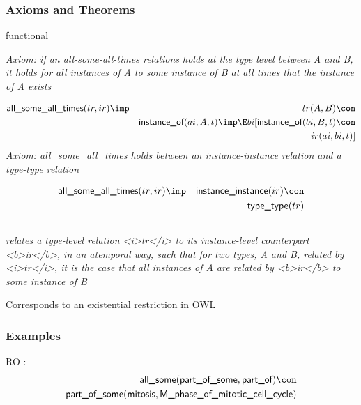 \subsubsection{Axioms and Theorems}

\begin{clist}
\item functional
\end{clist}

\emph{Axiom: if an all-some-all-times relations holds at the type level between A and B, it holds for all instances of A to some instance of B at all times that the instance of A exists}

\begin{eqnarray*}
 \pr{all\_some\_all\_times}(tr, ir) &\imp &tr(A, B) \con \\
&& \pr{instance\_of}(ai, A, t) \imp  \E bi[ \pr{instance\_of}(bi, B, t) \con \\
&&ir(ai, bi, t) ]
\end{eqnarray*}
\emph{Axiom: all\_some\_all\_times holds between an instance-instance relation and a type-type relation}

\begin{eqnarray*}
 \pr{all\_some\_all\_times}(tr, ir) &\imp & \pr{instance\_instance}(ir) \con \\
&& \pr{type\_type}(tr) 
\end{eqnarray*}

\subsection{ }
\emph{relates a type-level relation <i>tr</i> to its instance-level counterpart <b>ir</b>, in an atemporal way, such that for two types, A and B, related by <i>tr</i>, it is the case that all instances of A are related by <b>ir</b> to some instance of B}

Corresponds to an existential restriction in OWL

\subsubsection{Examples}
\begin{clist}
\item RO : \begin{eqnarray*}
 \pr{all\_some}( \pr{part\_of\_some},  \pr{part\_of}) \con \\
 \pr{part\_of\_some}( \pr{mitosis},  \pr{M\_phase\_of\_mitotic\_cell\_cycle}) 
\end{eqnarray*}

\end{clist}

